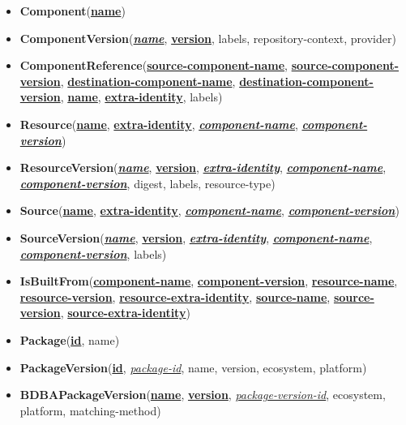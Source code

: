 \begin{itemize}
	\item \textbf{Component}(\textbf{\underline{name}})
	\item \textbf{ComponentVersion}(\textbf{\underline{\textit{name}}}, \textbf{\underline{version}}, labels, repository-context, provider)
	\item \textbf{ComponentReference}(\textbf{\underline{source-component-name}}, \textbf{\underline{source-component-version}}, \textbf{\underline{destination-component-name}}, \textbf{\underline{destination-component-version}}, \textbf{\underline{name}}, \textbf{\underline{extra-identity}}, labels)
	\item \textbf{Resource}(\textbf{\underline{name}}, \textbf{\underline{extra-identity}}, \textbf{\underline{\textit{component-name}}}, \textbf{\underline{\textit{component-version}}})
	\item \textbf{ResourceVersion}(\textbf{\underline{\textit{name}}}, \textbf{\underline{version}}, \textbf{\underline{\textit{extra-identity}}}, \textbf{\underline{\textit{component-name}}}, \textbf{\underline{\textit{component-version}}}, digest, labels, resource-type) %
	\item \textbf{Source}(\textbf{\underline{name}}, \textbf{\underline{extra-identity}}, \textbf{\underline{\textit{component-name}}}, \textbf{\underline{\textit{component-version}}})
	\item \textbf{SourceVersion}(\textbf{\underline{\textit{name}}}, \textbf{\underline{version}}, \textbf{\underline{\textit{extra-identity}}}, \textbf{\underline{\textit{component-name}}}, \textbf{\underline{\textit{component-version}}}, labels)
	\item \textbf{IsBuiltFrom}(\textbf{\underline{component-name}}, \textbf{\underline{component-version}}, \textbf{\underline{resource-name}}, \textbf{\underline{resource-version}}, \textbf{\underline{resource-extra-identity}}, \textbf{\underline{source-name}}, \textbf{\underline{source-version}}, \textbf{\underline{source-extra-identity}})
	\item \textbf{Package}(\textbf{\underline{id}}, name)
	\item \textbf{PackageVersion}(\textbf{\underline{id}}, \underline{\textit{package-id}}, name, version, ecosystem, platform)
	\item \textbf{BDBAPackageVersion}(\textbf{\underline{name}}, \textbf{\underline{version}}, \underline{\textit{package-version-id}}, ecosystem, platform, matching-method)

\end{itemize}

